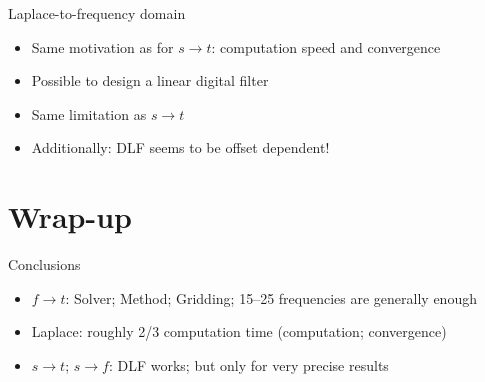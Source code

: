 \documentclass[xcolor=svgnames, usepdftitle=false, aspectratio=169]{beamer}
\newcommand{\ato}{\addtocounter{framenumber}{1}}
\begin{document}
\begin{frame}
  {Laplace-to-frequency domain}

  \begin{itemize}\itemsep.5cm
    \item Same motivation as for $s\rightarrow t$: computation speed and
      convergence
    \item Possible to design a linear digital filter
    \item Same limitation as $s\rightarrow t$
    \item Additionally: DLF seems to be offset dependent!
  \end{itemize}

\end{frame}

\ato
\section{Wrap-up} %


\begin{frame}
  {Conclusions}
  \begin{itemize}\itemsep1cm
    \item $f\rightarrow t$: Solver; Method; Gridding;
      \alert{15--25 frequencies are generally enough}
    \item \alert{Laplace: roughly 2/3 computation time} (computation;
      convergence)
    \item $s\rightarrow t$; $s\rightarrow f$: \alert{DLF works; but only for
      very precise results}
  \end{itemize}
\end{frame}
\end{document}
